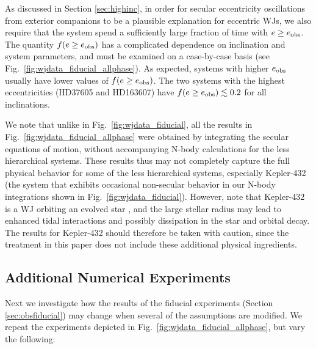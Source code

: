 \documentclass[12pt,useAMS, usenatbib]{mn2e}
\newcommand{\eobs}{e_{\rm obs}}
\begin{document}
As discussed in Section \ref{sec:highinc}, in order for secular eccentricity oscillations from exterior companions to be a plausible explanation for eccentric WJs, we also require that the system spend a sufficiently large fraction of time with $e \geq \eobs$.  The quantity $f(e \geq \eobs)$ has a complicated dependence on inclination and system parameters, and must be examined on a case-by-case basis (see Fig.~\ref{fig:wjdata_fiducial_allphase}).  As expected, systems with higher $\eobs$ usually have lower values of $f(e \geq \eobs)$.  The two systems with the highest eccentricities (HD37605 and HD163607) have $f(e \geq \eobs) \lesssim 0.2$ for all inclinations.

We note that unlike in Fig.~\ref{fig:wjdata_fiducial}, all the results in Fig.~\ref{fig:wjdata_fiducial_allphase} were obtained by integrating the secular equations of motion, without accompanying N-body calculations for the less hierarchical systems.  These results thus may not completely capture the full physical behavior for some of the less hierarchical systems, especially Kepler-432 (the system that exhibits occasional non-secular behavior in our N-body integrations shown in Fig.~\ref{fig:wjdata_fiducial}).    However, note that Kepler-432 is a WJ orbiting an evolved star \citep{ciceri2015, ortiz2015, quinn2015}, and the large stellar radius may lead to enhanced tidal interactions and possibly dissipation in the star and orbital decay.  The results for Kepler-432 should therefore be taken with caution, since the treatment in this paper does not include these additional physical ingredients.

\subsection{Additional Numerical Experiments}
\label{sec:additional}
Next we investigate how the results of the fiducial experiments (Section \ref{sec:obsfiducial}) may change when several of the assumptions are modified. We repeat the experiments depicted in Fig.~\ref{fig:wjdata_fiducial_allphase}, but vary the following:
\end{document}
